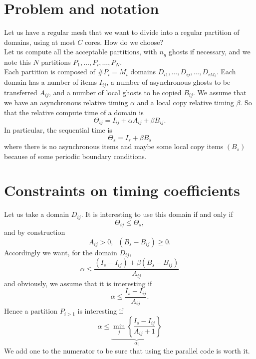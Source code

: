 \documentclass[aps,onecolumn,11pt]{revtex4}
\begin{document}
\section{Problem and notation}
Let us have a regular mesh that we want to divide into a regular partition of domains, using at most $C$ cores.
How do we choose?\\
Let us compute all the acceptable partitions, with $n_g$ ghosts if necessary, and we note this $N$ partitions 
$P_1,\ldots,P_i,\ldots,P_N$.\\
Each partition is composed of $\#P_i=M_i$ domains $D_{i1},\ldots,D_{ij},\ldots,D_{iM_i}$.
Each domain has a number of items $I_{ij}$, a number of asynchronous ghosts to be transferred $A_{ij}$, 
and a number of local ghosts to be copied $B_{ij}$. We assume that we have an asynchronous relative
timing $\alpha$ and a local copy relative timing $\beta$.
So that the relative compute time of a domain is
$$
	\Theta_{ij} = I_{ij} + \alpha A_{ij} + \beta B_{ij}.
$$
In particular, the sequential time is
$$
	\Theta_{s} = I_s + \beta B_s
$$
where there is no asynchronous items and maybe some local copy items $(B_s)$ because of some periodic boundary conditions.


\section{Constraints on timing coefficients}
Let us take a domain $D_{ij}$. It is interesting to use this domain if and only if
$$
	\Theta_{ij} \leq \Theta_s,
$$
and by construction
$$
	A_{ij}>0, \;\; \left(B_s-B_{ij}\right) \geq 0.
$$
Accordingly we want, for the domain $D_{ij}$,
$$
\alpha \leq \dfrac{\left(I_s-I_{ij}\right) + \beta \left(B_s-B_{ij}\right)}{A_{ij}}
$$
and obviously, we assume that it is interesting if
$$
	\alpha \leq \dfrac{I_s-I_{ij}}{A_{ij}}.
$$
Hence a partition $P_{i>1}$ is interesting if
\begin{equation}
	\alpha \leq \underbrace{\min_{j} \left\lbrace \dfrac{I_s-I_{ij}}{A_{ij}+1} \right\rbrace}_{\alpha_i}
\end{equation}
We add one to the numerator to be sure that using the parallel code is worth it.
\end{document}
